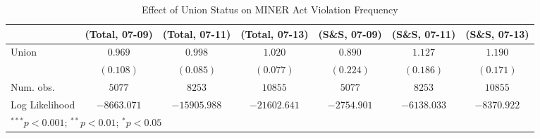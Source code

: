 
\begin{table}[H]
\begin{center}
\begin{tabular}{l c c c c c c}
\hline
 & (Total, 07-09) & (Total, 07-11) & (Total, 07-13) & (S\&S, 07-09) & (S\&S, 07-11) & (S\&S, 07-13) \\
\hline
Union          & $0.969$     & $0.998$      & $1.020$      & $0.890$     & $1.127$     & $1.190$     \\
               & $(0.108)$   & $(0.085)$    & $(0.077)$    & $(0.224)$   & $(0.186)$   & $(0.171)$   \\
\hline
Num. obs.      & $5077$      & $8253$       & $10855$      & $5077$      & $8253$      & $10855$     \\
Log Likelihood & $-8663.071$ & $-15905.988$ & $-21602.641$ & $-2754.901$ & $-6138.033$ & $-8370.922$ \\
\hline
\multicolumn{7}{l}{\scriptsize{$^{***}p<0.001$; $^{**}p<0.01$; $^{*}p<0.05$}}
\end{tabular}
\caption{Effect of Union Status on MINER Act Violation Frequency}
\label{irr_100employees_mineract_violations}
\end{center}
\end{table}

